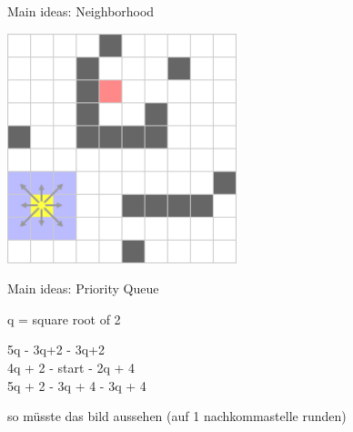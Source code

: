 \documentclass{presentation}
\begin{document}
\begin{frame}{Main ideas: Neighborhood}
	\begin{center}
		\includegraphics[width=0.5\textwidth]{figures/A-Stern_geschnitten(241x241)/2.png}
	\end{center}
\end{frame}


\begin{frame}{Main ideas: Priority Queue}


	q = square root of 2
	\vspace{1cm}

	5q - 3q+2 - 3q+2\\
	4q + 2 - start - 2q + 4\\
	5q + 2 - 3q + 4 - 3q + 4

	\vspace{1cm}
	so müsste das bild aussehen (auf 1 nachkommastelle runden)
\end{frame}
\end{document}
